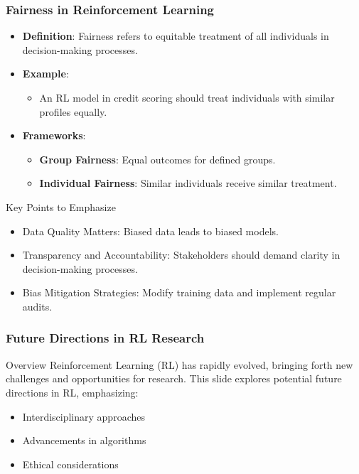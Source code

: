 \documentclass{beamer}
\begin{document}
\begin{frame}[fragile]
    \frametitle{Fairness in Reinforcement Learning}
    \begin{itemize}
        \item \textbf{Definition}: Fairness refers to equitable treatment of all individuals in decision-making processes.
        \item \textbf{Example}: 
            \begin{itemize}
                \item An RL model in credit scoring should treat individuals with similar profiles equally.
            \end{itemize}
        \item \textbf{Frameworks}:
            \begin{itemize}
                \item \textbf{Group Fairness}: Equal outcomes for defined groups.
                \item \textbf{Individual Fairness}: Similar individuals receive similar treatment.
            \end{itemize}
    \end{itemize}
    \begin{block}{Key Points to Emphasize}
        \begin{itemize}
            \item Data Quality Matters: Biased data leads to biased models.
            \item Transparency and Accountability: Stakeholders should demand clarity in decision-making processes.
            \item Bias Mitigation Strategies: Modify training data and implement regular audits.
        \end{itemize}
    \end{block}
\end{frame}

\begin{frame}[fragile]
    \frametitle{Future Directions in RL Research}
    \begin{block}{Overview}
        Reinforcement Learning (RL) has rapidly evolved, bringing forth new challenges and opportunities for research. This slide explores potential future directions in RL, emphasizing:
    \end{block}
    \begin{itemize}
        \item Interdisciplinary approaches
        \item Advancements in algorithms
        \item Ethical considerations
    \end{itemize}
\end{frame}
\end{document}
